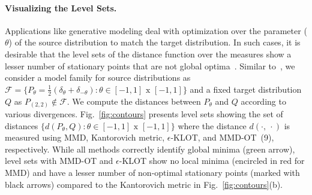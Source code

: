 \paragraph{Visualizing the Level Sets.}
Applications like generative modeling deal with optimization over the parameter (${\theta}$) of the source distribution to match the target distribution. In such cases, it is desirable that the level sets of the distance function over the measures show a lesser number of stationary points that are not global optima~\citep{bottou2017geometrical}. Similar to~\cite{bottou2017geometrical}, we consider a model family for source distributions as
$\mathcal{F} = \{P_{\theta}=\frac{1}{2}(\delta_{\theta}+\delta_{-\theta}):\theta\in[-1,1]\textrm{ x }[-1, 1]\}$ and a fixed target distribution $Q$ as $P_{(2, 2)}\notin \mathcal{F}$. We compute the distances between $P_{\theta}$ and $Q$ according to various divergences.
Fig.~\ref{fig:contours} presents level sets showing the set of distances $\{d(P_{\theta}, Q): \theta\in[-1,1]\textrm{ x }[-1, 1]\}$ where the distance $d(\cdot , \ \cdot)$ is measured using MMD, Kantorovich metric, $\epsilon$-KLOT, and MMD-OT~(9), respectively. 
While all methods correctly identify global minima (green arrow), level sets with MMD-OT and $\epsilon$-KLOT show no local minima (encircled in red for MMD) and have a lesser number of non-optimal stationary points (marked with black arrows) compared to the Kantorovich metric in Fig.~\ref{fig:contours}(b).
